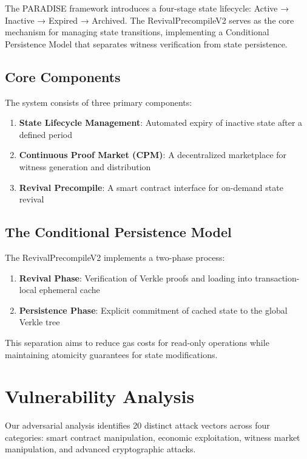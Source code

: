 \documentclass{article}
\begin{document}
The PARADISE framework introduces a four-stage state lifecycle: Active → Inactive → Expired → Archived. The RevivalPrecompileV2 serves as the core mechanism for managing state transitions, implementing a Conditional Persistence Model that separates witness verification from state persistence.

\subsection{Core Components}

The system consists of three primary components:

\begin{enumerate}
\item \textbf{State Lifecycle Management}: Automated expiry of inactive state after a defined period
\item \textbf{Continuous Proof Market (CPM)}: A decentralized marketplace for witness generation and distribution
\item \textbf{Revival Precompile}: A smart contract interface for on-demand state revival
\end{enumerate}

\subsection{The Conditional Persistence Model}

The RevivalPrecompileV2 implements a two-phase process:
\begin{enumerate}
\item \textbf{Revival Phase}: Verification of Verkle proofs and loading into transaction-local ephemeral cache
\item \textbf{Persistence Phase}: Explicit commitment of cached state to the global Verkle tree
\end{enumerate}

This separation aims to reduce gas costs for read-only operations while maintaining atomicity guarantees for state modifications.

\section{Vulnerability Analysis}

Our adversarial analysis identifies 20 distinct attack vectors across four categories: smart contract manipulation, economic exploitation, witness market manipulation, and advanced cryptographic attacks.
\end{document}
